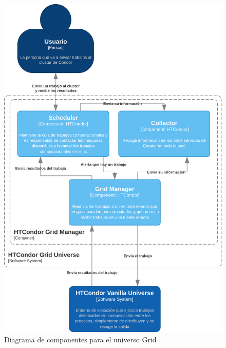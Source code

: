 \begin{figure}[H]
	\centering
	\includegraphics[scale=0.1]{tablas-images/C4/Diagramas HTCondor-Nivel 3 - Grid.drawio.png}
	\caption{Diagrama de componentes para el universo Grid}
    \label{fig:C4Nivel3Grid}
\end{figure}


